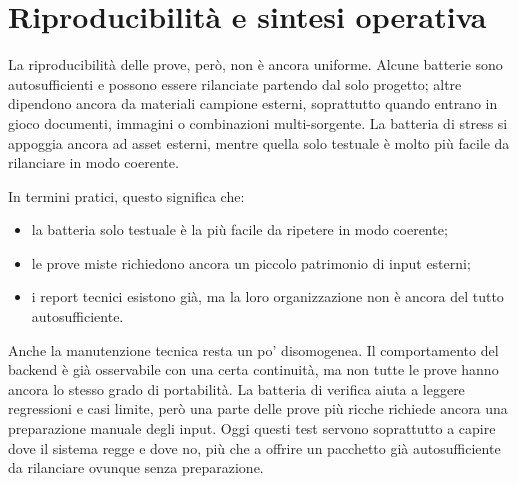 \section{Riproducibilità e sintesi operativa}
La riproducibilità delle prove, però, non è ancora uniforme. Alcune batterie sono autosufficienti e possono essere rilanciate partendo dal solo progetto; altre dipendono ancora da materiali campione esterni, soprattutto quando entrano in gioco documenti, immagini o combinazioni multi-sorgente. La batteria di stress si appoggia ancora ad asset esterni, mentre quella solo testuale è molto più facile da rilanciare in modo coerente.

In termini pratici, questo significa che:
\begin{itemize}
\item la batteria solo testuale è la più facile da ripetere in modo coerente;
\item le prove miste richiedono ancora un piccolo patrimonio di input esterni;
\item i report tecnici esistono già, ma la loro organizzazione non è ancora del tutto autosufficiente.
\end{itemize}

Anche la manutenzione tecnica resta un po' disomogenea. Il comportamento del backend è già osservabile con una certa continuità, ma non tutte le prove hanno ancora lo stesso grado di portabilità. La batteria di verifica aiuta a leggere regressioni e casi limite, però una parte delle prove più ricche richiede ancora una preparazione manuale degli input. Oggi questi test servono soprattutto a capire dove il sistema regge e dove no, più che a offrire un pacchetto già autosufficiente da rilanciare ovunque senza preparazione.

